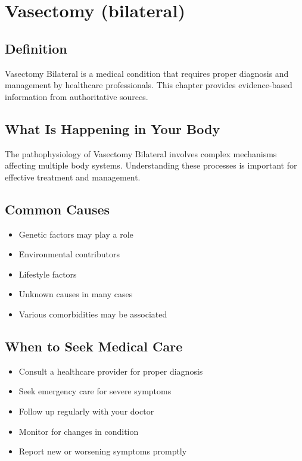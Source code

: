 
\chapter{Vasectomy (bilateral)}

\section*{Definition}
Vasectomy Bilateral is a medical condition that requires proper diagnosis and management by healthcare professionals. This chapter provides evidence-based information from authoritative sources.

\section*{What Is Happening in Your Body}
The pathophysiology of Vasectomy Bilateral involves complex mechanisms affecting multiple body systems. Understanding these processes is important for effective treatment and management.

\section*{Common Causes}
\begin{itemize}
  \item Genetic factors may play a role
  \item Environmental contributors
  \item Lifestyle factors
  \item Unknown causes in many cases
  \item Various comorbidities may be associated
\end{itemize}

\section*{When to Seek Medical Care}
\begin{itemize}
  \item Consult a healthcare provider for proper diagnosis
  \item Seek emergency care for severe symptoms
  \item Follow up regularly with your doctor
  \item Monitor for changes in condition
  \item Report new or worsening symptoms promptly
\end{itemize}

